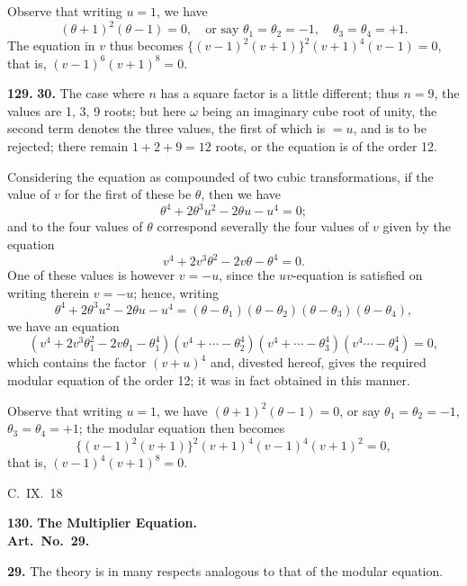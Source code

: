\documentclass[11pt,a4paper]{article}
\theoremstyle{plain}
\begin{document}
Observe that writing $u = 1$, we have
\[
(\theta + 1)^2(\theta - 1) = 0, \quad \text{or say } \theta_1 = \theta_2 = -1, \quad \theta_3 = \theta_4 = +1.
\]
The equation in $v$ thus becomes $\{(v - 1)^2(v + 1)\}^2(v + 1)^4(v - 1) = 0$, that is, $(v - 1)^6(v + 1)^8 = 0$.


\noindent\textbf{129.} \textbf{30.} The case where $n$ has a square factor is a little different; thus $n = 9$, the values are 1, 3, 9 roots; but here $\omega$ being an imaginary cube root of unity, the second term denotes the three values, the first of which is $= u$, and is to be rejected; there remain $1 + 2 + 9 = 12$ roots, or the equation is of the order 12.

Considering the equation as compounded of two cubic transformations, if the value of $v$ for the first of these be $\theta$, then we have
\[
\theta^4 + 2\theta^3u^2 - 2\theta u - u^4 = 0;
\]
and to the four values of $\theta$ correspond severally the four values of $v$ given by the equation
\[
v^4 + 2v^3\theta^2 - 2v\theta - \theta^4 = 0.
\]
One of these values is however $v = -u$, since the $uv$-equation is satisfied on writing therein $v = -u$; hence, writing
\[
\theta^4 + 2\theta^3u^2 - 2\theta u - u^4 = (\theta - \theta_1)(\theta - \theta_2)(\theta - \theta_3)(\theta - \theta_4),
\]
we have an equation
\[
(v^4 + 2v^3\theta_1^2 - 2v\theta_1 - \theta_1^4)(v^4 + \cdots - \theta_2^4)(v^4 + \cdots - \theta_3^4)(v^4 \cdots - \theta_4^4) = 0,
\]
which contains the factor $(v + u)^4$ and, divested hereof, gives the required modular equation of the order 12; it was in fact obtained in this manner.

Observe that writing $u = 1$, we have $(\theta + 1)^2(\theta - 1) = 0$, or say $\theta_1 = \theta_2 = -1$, $\theta_3 = \theta_4 = +1$; the modular equation then becomes
\[
\{(v - 1)^2(v + 1)\}^2(v + 1)^4(v - 1)^4(v + 1)^2 = 0,
\]
that is, $(v - 1)^4(v + 1)^8 = 0$.

\begin{flushright}
C.~IX.~18
\end{flushright}


\noindent\textbf{130.} \textbf{The Multiplier Equation.}\\
\textbf{Art.~No.~29.}

\medskip
\noindent\textbf{29.} The theory is in many respects analogous to that of the modular equation.
\end{document}
